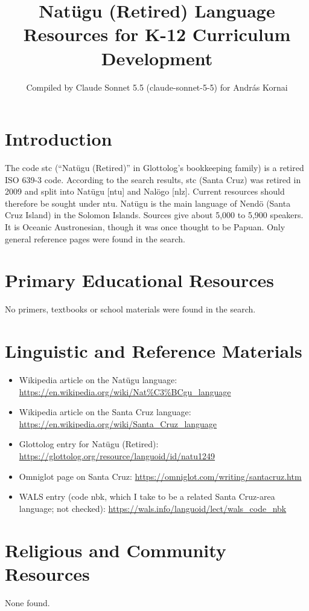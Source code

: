 \documentclass[12pt]{article}
\title{Nat\"ugu (Retired) Language Resources for K-12 Curriculum Development}
\author{Compiled by Claude Sonnet 5.5 (claude-sonnet-5-5) for Andr\'as Kornai}
\date{}
\begin{document}
\maketitle

\section{Introduction}
The code stc (``Natügu (Retired)'' in Glottolog's bookkeeping family) is a retired ISO 639-3 code. According to the search results, stc (Santa Cruz) was retired in 2009 and split into Natügu [ntu] and Nal\"ogo [nlz]. Current resources should therefore be sought under ntu. Natügu is the main language of Nend\"o (Santa Cruz Island) in the Solomon Islands. Sources give about 5,000 to 5,900 speakers. It is Oceanic Austronesian, though it was once thought to be Papuan. Only general reference pages were found in the search.

\section{Primary Educational Resources}
No primers, textbooks or school materials were found in the search.

\section{Linguistic and Reference Materials}
\begin{itemize}
\item Wikipedia article on the Natügu language: \url{https://en.wikipedia.org/wiki/Nat%C3%BCgu_language}
\item Wikipedia article on the Santa Cruz language: \url{https://en.wikipedia.org/wiki/Santa_Cruz_language}
\item Glottolog entry for Natügu (Retired): \url{https://glottolog.org/resource/languoid/id/natu1249}
\item Omniglot page on Santa Cruz: \url{https://omniglot.com/writing/santacruz.htm}
\item WALS entry (code nbk, which I take to be a related Santa Cruz-area language; not checked): \url{https://wals.info/languoid/lect/wals_code_nbk}
\end{itemize}

\section{Religious and Community Resources}
None found.
\end{document}
